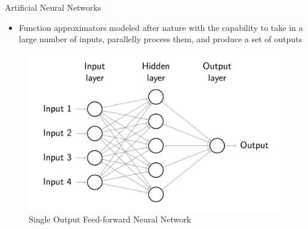 \documentclass[final]{beamer}
\newlength{\onecolwid}
\newlength{\twocolwid}
\begin{document}
\begin{frame}[t]
\begin{columns}[t]
\begin{column}{\twocolwid}
\begin{columns}[t,totalwidth=\twocolwid]
\begin{column}{\onecolwid}\begin{block}{Artificial Neural Networks}
	\begin{itemize}
		\item Function approximators modeled after nature with the capability to take in a large number of inputs, parallelly process them, and produce a set of outputs
	\end{itemize}
	\vspace{-1.2cm}
	\begin{figure}
		\centering
		\includegraphics[width=.8\linewidth]{Figures/FeedForwardRendered}
		\caption{Single Output Feed-forward Neural Network}
		\label{fig:feedforward}
	\end{figure}
	\vspace{-3cm}
\end{block}\end{column}


\end{columns}
\end{column}
\end{columns}
\end{frame}
\end{document}

